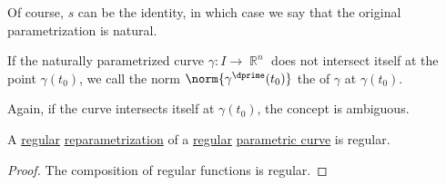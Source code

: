 \begin{definition}
\begin{thmenum}
    Of course, \( s \) can be the identity, in which case we say that the original parametrization is natural.

     If the naturally parametrized curve \( \gamma: I \to \BbbR^n \) does not intersect itself at the point \( \gamma(t_0) \), we call the norm \( \norm{\gamma^\dprime(t_0)} \) the  of \( \gamma \) at \( \gamma(t_0) \).

    Again, if the curve intersects itself at \( \gamma(t_0) \), the concept is ambiguous.
  \end{thmenum}
\end{definition}

\begin{proposition}\label{thm:regular_reparametrization}
  A \hyperref[def:function_regular_at_point]{regular} \hyperref[def:parametric_curve_reparametrization]{reparametrization} of a \hyperref[def:smooth_curve/regular]{regular} \hyperref[def:parametric_curve]{parametric curve} is regular.
\end{proposition}
\begin{proof}
  The composition of regular functions is regular.
\end{proof}

